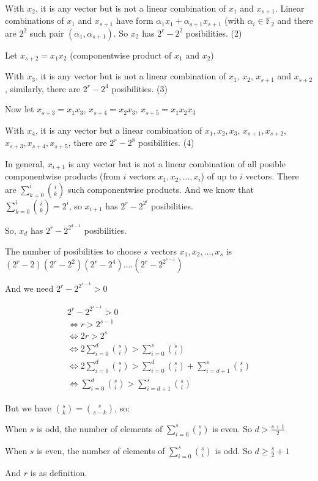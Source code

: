\documentclass{article}
\begin{document}
With $x_2$, it is any vector but is not a linear combination of $x_1$ and $x_{s+1}$. Linear combinations of $x_1$ and $x_{s+1}$ have form $\alpha_1x_1+\alpha_{s+1}x_{s+1}$ (with $\alpha_i \in \mathbb{F}_2$ and there are $2^2$ such pair $(\alpha_1, \alpha_{s+1})$. So $x_2$ has $2^r-2^2$ posibilities. (2)

Let $x_{s+2}=x_1x_2$ (componentwise product of $x_1$ and $x_2$)

With $x_3$, it is any vector but is not a linear combination of $x_1$, $x_2$, $x_{s+1}$ and $x_{s+2}$, similarly, there are $2^r-2^4$ posibilities. (3)

Now let $x_{s+3}=x_1x_3$, $x_{s+4}=x_2x_3$, $x_{s+5}=x_1x_2x_3$

With $x_4$, it is any vector but a linear combination of $x_1, x_2, x_3$, $x_{s+1}, x_{s+2}$, $x_{s+3}, x_{s+4}, x_{s+5}$, there are $2^r-2^8$ posibilities. (4)

In general, $x_{i+1}$ is any vector but is not a linear combination of all posible componentwise products (from $i$ vectors $x_1, x_2, ..., x_i$) of up to $i$ vectors. There are $\sum_{k=0}^{i} \binom{i}{k}$ such componentwise products. And we know that $\sum_{k=0}^{i} \binom{i}{k} = 2^i$, so $x_{i+1}$ has $2^r-2^{2^{i}}$ posibilities.

So, $x_d$ has $2^r-2^{2^{d-1}}$ posibilities.

The number of posibilities to choose $s$ vectors $x_1, x_2, ..., x_s$ is $(2^r-2)(2^r-2^2)(2^r-2^4)....(2^r-2^{2^{s-1}})$

And we need $2^r-2^{2^{s-1}} > 0$

\begin{gather*}
    2^r-2^{2^{s-1}} > 0 \\
    \Leftrightarrow r>2^{s-1} \\
    \Leftrightarrow 2r > 2^s \\
    \Leftrightarrow 2\sum_{i=0}^{d} \binom{s}{i} > \sum_{i=0}^{s} \binom{s}{i} \\
    \Leftrightarrow 2\sum_{i=0}^{d} \binom{s}{i} > \sum_{i=0}^d \binom{s}{i} + \sum_{i=d+1}^{s} \binom{s}{i} \\
    \Leftrightarrow \sum_{i=0}^{d} \binom{s}{i} > \sum_{i=d+1}^{s} \binom{s}{i}
\end{gather*}

But we have $\binom{s}{k} = \binom{s}{s-k}$, so:

When $s$ is odd, the number of elements of $\sum_{i=0}^s \binom{s}{i}$ is even. So $d > \frac{s+1}{2}$

When $s$ is even, the number of elements of $\sum_{i=0}^s \binom{s}{i}$ is odd. So $d \geq \frac{s}{2}+1$

And $r$ is as definition.
\end{document}
